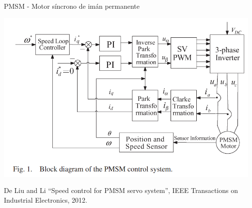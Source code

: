 \documentclass[presentation,aspectratio=1610]{beamer}
\begin{document}
\begin{frame}[label={sec:orgc3bdbca}]{PMSM - Motor síncrono de imán permanente}
\begin{center}
\includegraphics[width=0.8\linewidth]{../../figures/pmsm_control_block_diag.png}
\end{center}
{\footnotesize De Liu and Li  ``Speed control for PMSM servo system'', IEEE Transactions on Industrial Electronics, 2012.}
\end{frame}
\end{document}
